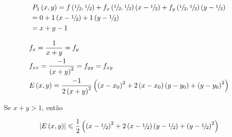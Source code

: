 \documentclass[11pt, oneside, a4paper]{gsm-l}
\begin{document}
\begin{sol}
\[
\begin{gathered}
P_1 \left( {x,y} \right) = f\left( {{\raise0.5ex\hbox{$\scriptstyle 1$}
\kern-0.1em/\kern-0.15em
\lower0.25ex\hbox{$\scriptstyle 2$}},{\raise0.5ex\hbox{$\scriptstyle 1$}
\kern-0.1em/\kern-0.15em
\lower0.25ex\hbox{$\scriptstyle 2$}}} \right) + f_x \left( {{\raise0.5ex\hbox{$\scriptstyle 1$}
\kern-0.1em/\kern-0.15em
\lower0.25ex\hbox{$\scriptstyle 2$}},{\raise0.5ex\hbox{$\scriptstyle 1$}
\kern-0.1em/\kern-0.15em
\lower0.25ex\hbox{$\scriptstyle 2$}}} \right)\left( {x - {\raise0.5ex\hbox{$\scriptstyle 1$}
\kern-0.1em/\kern-0.15em
\lower0.25ex\hbox{$\scriptstyle 2$}}} \right) + f_y \left( {{\raise0.5ex\hbox{$\scriptstyle 1$}
\kern-0.1em/\kern-0.15em
\lower0.25ex\hbox{$\scriptstyle 2$}},{\raise0.5ex\hbox{$\scriptstyle 1$}
\kern-0.1em/\kern-0.15em
\lower0.25ex\hbox{$\scriptstyle 2$}}} \right)\left( {y - {\raise0.5ex\hbox{$\scriptstyle 1$}
\kern-0.1em/\kern-0.15em
\lower0.25ex\hbox{$\scriptstyle 2$}}} \right) \hfill \\
= 0 + 1\left( {x - {\raise0.5ex\hbox{$\scriptstyle 1$}
\kern-0.1em/\kern-0.15em
\lower0.25ex\hbox{$\scriptstyle 2$}}} \right) + 1\left( {y - {\raise0.5ex\hbox{$\scriptstyle 1$}
\kern-0.1em/\kern-0.15em
\lower0.25ex\hbox{$\scriptstyle 2$}}} \right) \hfill \\
= x + y - 1 \hfill \\
\end{gathered}
\]

\[
\begin{gathered}
f_x  = \frac{1}
{{x + y}} = f_y  \hfill \\
f_{xx}  = \frac{{ - 1}}
{{\left( {x + y} \right)^2 }} = f_{yy}  = f_{xy}  \hfill \\
E\left( {x,y} \right) = \frac{{ - 1}}
{{2\left( {x + y} \right)^2 }}\left( {\left( {x - x_0 } \right)^2  + 2\left( {x - x_0 } \right)\left( {y - y_0 } \right) + \left( {y - y_0 } \right)^2 } \right) \hfill \\
\end{gathered}
\]

Se $x + y > 1$, então

\[
\left| {E\left( {x,y} \right)} \right| \leqslant \frac{1}
{2}\left( {\left( {x - {\raise0.5ex\hbox{$\scriptstyle 1$}
\kern-0.1em/\kern-0.15em
\lower0.25ex\hbox{$\scriptstyle 2$}}} \right)^2  + 2\left( {x - {\raise0.5ex\hbox{$\scriptstyle 1$}
\kern-0.1em/\kern-0.15em
\lower0.25ex\hbox{$\scriptstyle 2$}}} \right)\left( {y - {\raise0.5ex\hbox{$\scriptstyle 1$}
\kern-0.1em/\kern-0.15em
\lower0.25ex\hbox{$\scriptstyle 2$}}} \right) + \left( {y - {\raise0.5ex\hbox{$\scriptstyle 1$}
\kern-0.1em/\kern-0.15em
\lower0.25ex\hbox{$\scriptstyle 2$}}} \right)^2 } \right)
\]


\end{sol}
\end{document}
